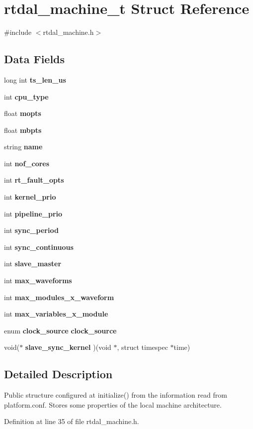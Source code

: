 \section{rtdal\-\_\-machine\-\_\-t Struct Reference}
\label{structrtdal__machine__t}


{\ttfamily \#include $<$rtdal\-\_\-machine.\-h$>$}

\subsection*{Data Fields}
\begin{DoxyCompactItemize}
\item 
long int {\bf ts\-\_\-len\-\_\-us}
\item 
int {\bf cpu\-\_\-type}
\item 
float {\bf mopts}
\item 
float {\bf mbpts}
\item 
string {\bf name}
\item 
int {\bf nof\-\_\-cores}
\item 
int {\bf rt\-\_\-fault\-\_\-opts}
\item 
int {\bf kernel\-\_\-prio}
\item 
int {\bf pipeline\-\_\-prio}
\item 
int {\bf sync\-\_\-period}
\item 
int {\bf sync\-\_\-continuous}
\item 
int {\bf slave\-\_\-master}
\item 
int {\bf max\-\_\-waveforms}
\item 
int {\bf max\-\_\-modules\-\_\-x\-\_\-waveform}
\item 
int {\bf max\-\_\-variables\-\_\-x\-\_\-module}
\item 
enum {\bf clock\-\_\-source} {\bf clock\-\_\-source}
\item 
void($\ast$ {\bf slave\-\_\-sync\-\_\-kernel} )(void $\ast$, struct timespec $\ast$time)
\end{DoxyCompactItemize}


\subsection{Detailed Description}
Public structure configured at initialize() from the information read from platform.\-conf. Stores some properties of the local machine architecture. 

Definition at line 35 of file rtdal\-\_\-machine.\-h.



